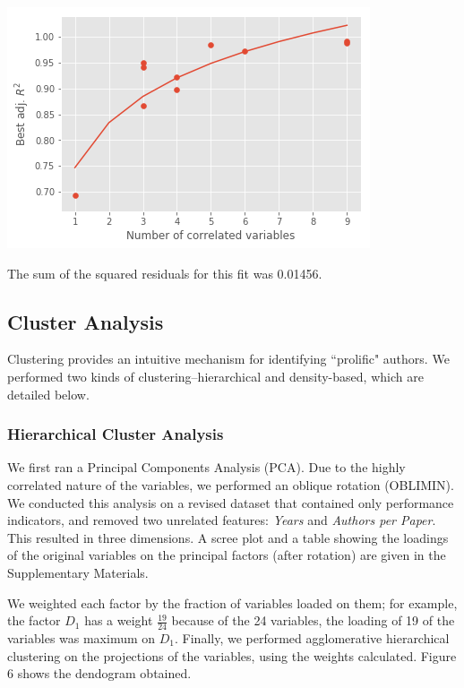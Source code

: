 \documentclass[smallextended]{svjour3}
\begin{document}
	\includegraphics[scale=0.5]{fig5.png}
	\begingroup
	\endgroup
	\hfill\break
	
	The sum of the squared residuals for this fit was 0.01456.
	
	\subsection{Cluster Analysis}
	Clustering provides an intuitive mechanism for identifying ``prolific" authors. We performed two kinds of clustering--hierarchical and density-based, which are detailed below.
	
	\subsubsection{Hierarchical Cluster Analysis}
	We first ran a Principal Components Analysis (PCA). Due to the highly correlated nature of the variables, we performed an oblique rotation (OBLIMIN). We conducted this analysis on a revised dataset that contained only performance indicators, and removed two unrelated features: \textit{Years} and \textit{Authors per Paper}. This resulted in three dimensions. A scree plot and a table showing the loadings of the original variables on the principal factors (after rotation) are given in the Supplementary Materials.
	
	We weighted each factor by the fraction of variables loaded on them; for example, the factor $D_1$ has a weight $\frac{19}{24}$ because of the 24 variables, the loading of 19 of the variables was maximum on $D_1$. Finally, we performed agglomerative hierarchical clustering on the projections of the variables, using the weights calculated. Figure 6 shows the dendogram obtained.
	
\end{document}

